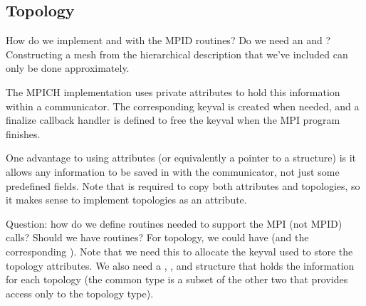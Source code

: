 \documentclass{article}
\begin{document}

\subsection{Topology}
\label{sec:topo}

How do we implement  and 
with the MPID routines?   
Do we need an  and
?  Constructing a mesh from the 
hierarchical description that we've included can only be done
approximately.

The MPICH implementation uses private attributes to hold this information 
within a communicator.  The corresponding keyval is created when
needed, and a finalize callback handler is defined to free the keyval
when the MPI program finishes.

One advantage to using attributes (or equivalently a pointer to a
structure) is it allows any information to be saved in with the
communicator, not just some predefined fields.  Note that
 is required to copy both attributes and
topologies, so it makes sense to implement topologies as an attribute.

Question: how do we define routines needed to support the MPI (not
MPID) calls?  Should we have  routines?  For topology, we
could have  (and the corresponding
).   Note that we need this to allocate the
keyval used to store the topology attributes.  We also need a
, , and
 structure that holds the information for each
topology (the common type is a subset of the other two that provides access
only to the topology type).
\end{document}

